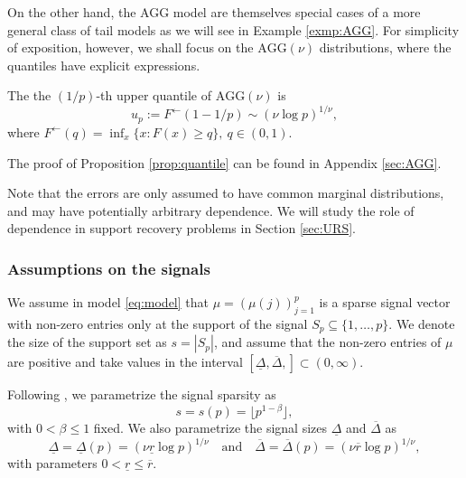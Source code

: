 On the other hand, the AGG model are themselves special cases of a more general class of tail models as we will see in Example \ref{exmp:AGG}.
For simplicity of exposition, however, we shall focus on the $\text{AGG}(\nu)$ distributions, where the quantiles have explicit expressions.
\begin{proposition} \label{prop:quantile}
The the $(1/p)$-th upper quantile of $\text{AGG}(\nu)$ is
\begin{equation} \label{eq:AGG-quantiles}
    u_{p} := F^\leftarrow(1-1/p) \sim \left(\nu\log{p}\right)^{1/\nu},
\end{equation}
where $F^\leftarrow(q) = \inf_x\{x:F(x)\ge q\},\ q\in (0,1)$.
\end{proposition}
The proof of Proposition \ref{prop:quantile} can be found in Appendix \ref{sec:AGG}.

Note that the errors are only assumed to have common marginal distributions, and may have potentially arbitrary dependence.
We will study the role of dependence in support recovery problems in Section \ref{sec:URS}. 

\subsubsection{Assumptions on the signals}
We assume in model \eqref{eq:model} that $\mu = \left(\mu(j)\right)_{j=1}^p$ is a sparse signal vector with non-zero entries only at the support of the signal $S_p\subseteq \{1,\ldots,p\}$. 
We denote the size of the support set as $s = |S_p|$, and assume that the non-zero entries of $\mu$ are positive and take values in the interval $\left[\underline{\Delta},\overline{\Delta},\right]\subset(0,\infty)$.

Following \citep{ingster1998minimax, donoho2004higher, cai2007estimation, haupt2011distilled, arias2017distribution}, we parametrize the signal sparsity as
\begin{equation} \label{eq:sparsity-parametrized}
    s = s(p) = \lfloor p^{1-\beta} \rfloor, %
\end{equation}
with $0 < \beta \le 1$ fixed. We also parametrize the signal sizes $\underline{\Delta}$ and $\overline{\Delta}$ as
\begin{equation} \label{eq:signal-size-parametrized}
    \underline{\Delta} = \underline{\Delta}(p) = (\nu \underline{r} \log{p})^{1/\nu} \quad \text{and} \quad
    \overline{\Delta} = \overline{\Delta}(p)  = (\nu \overline{r} \log{p})^{1/\nu},
\end{equation}
with parameters $0 < \underline{r} \le \overline{r}$.

